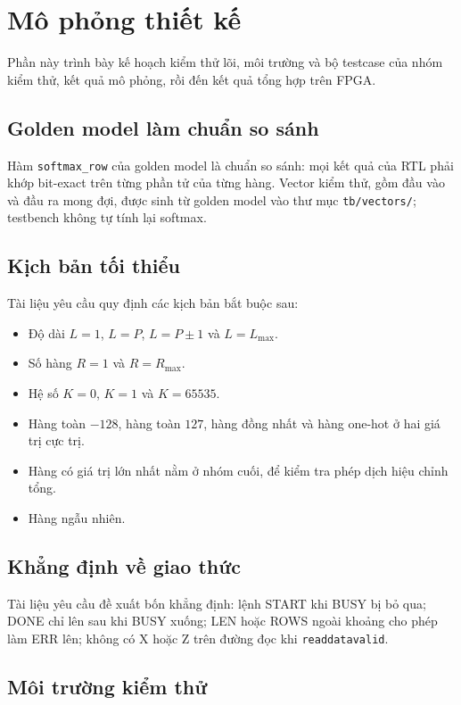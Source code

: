\section{Mô phỏng thiết kế}

Phần này trình bày kế hoạch kiểm thử lõi, môi trường và bộ testcase của nhóm kiểm thử, kết quả mô phỏng, rồi đến kết quả tổng hợp trên FPGA.

\subsection{Golden model làm chuẩn so sánh}

Hàm \texttt{softmax\_row} của golden model là chuẩn so sánh: mọi kết quả của RTL phải khớp bit-exact trên từng phần tử của từng hàng. Vector kiểm thử, gồm đầu vào và đầu ra mong đợi, được sinh từ golden model vào thư mục \texttt{tb/vectors/}; testbench không tự tính lại softmax.

\subsection{Kịch bản tối thiểu}

Tài liệu yêu cầu quy định các kịch bản bắt buộc sau:
\begin{itemize}
  \item Độ dài $L = 1$, $L = P$, $L = P \pm 1$ và $L = L_{\max}$.
  \item Số hàng $R = 1$ và $R = R_{\max}$.
  \item Hệ số $K = 0$, $K = 1$ và $K = 65535$.
  \item Hàng toàn $-128$, hàng toàn $127$, hàng đồng nhất và hàng one-hot ở hai giá trị cực trị.
  \item Hàng có giá trị lớn nhất nằm ở nhóm cuối, để kiểm tra phép dịch hiệu chỉnh tổng.
  \item Hàng ngẫu nhiên.
\end{itemize}

\subsection{Khẳng định về giao thức}

Tài liệu yêu cầu đề xuất bốn khẳng định: lệnh START khi BUSY bị bỏ qua; DONE chỉ lên sau khi BUSY xuống; LEN hoặc ROWS ngoài khoảng cho phép làm ERR lên; không có X hoặc Z trên đường đọc khi \texttt{readdatavalid}.

\subsection{Môi trường kiểm thử}

